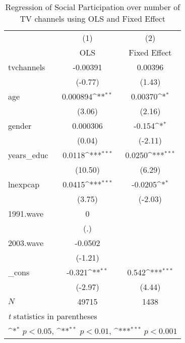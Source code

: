 \begin{table}[htbp]\centering
\def\sym#1{\ifmmode^{#1}\else\(^{#1}\)\fi}
\caption{ Regression of Social Participation over number of TV channels using OLS and Fixed Effect}
\begin{tabular}{l*{2}{c}}
\hline\hline
            &\multicolumn{1}{c}{(1)}&\multicolumn{1}{c}{(2)}\\
            &\multicolumn{1}{c}{OLS}&\multicolumn{1}{c}{Fixed Effect}\\
\hline
tvchannels  &    -0.00391         &     0.00396         \\
            &     (-0.77)         &      (1.43)         \\
[1em]
age         &    0.000894\sym{**} &     0.00370\sym{*}  \\
            &      (3.06)         &      (2.16)         \\
[1em]
gender      &    0.000306         &      -0.154\sym{*}  \\
            &      (0.04)         &     (-2.11)         \\
[1em]
years\_educ  &      0.0118\sym{***}&      0.0250\sym{***}\\
            &     (10.50)         &      (6.29)         \\
[1em]
lnexpcap    &      0.0415\sym{***}&     -0.0205\sym{*}  \\
            &      (3.75)         &     (-2.03)         \\
[1em]
1991.wave   &           0         &                     \\
            &         (.)         &                     \\
[1em]
2003.wave   &     -0.0502         &                     \\
            &     (-1.21)         &                     \\
[1em]
\_cons      &      -0.321\sym{**} &       0.542\sym{***}\\
            &     (-2.97)         &      (4.44)         \\
\hline
\(N\)       &       49715         &        1438         \\
\hline\hline
\multicolumn{3}{l}{\footnotesize \textit{t} statistics in parentheses}\\
\multicolumn{3}{l}{\footnotesize \sym{*} \(p<0.05\), \sym{**} \(p<0.01\), \sym{***} \(p<0.001\)}\\
\end{tabular}
\end{table}
